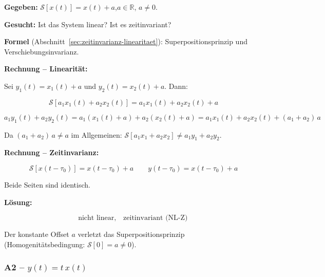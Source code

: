 \begin{beispiel}[Linearität und Zeitinvarianz: $y(t) = x(t) + a$]

\textbf{Gegeben:} $\mathcal{S}[x(t)] = x(t) + a$,\quad $a \in \mathbb{R}$, $a \neq 0$.

\textbf{Gesucht:} Ist das System linear? Ist es zeitinvariant?

\textbf{Formel} (Abschnitt~\ref{sec:zeitinvarianz-linearitaet}): Superpositionsprinzip
und Verschiebungsinvarianz.

\textbf{Rechnung – Linearität:}

Sei $y_1(t) = x_1(t) + a$ und $y_2(t) = x_2(t) + a$. Dann:

$$
\mathcal{S}[a_1 x_1(t) + a_2 x_2(t)]
= a_1 x_1(t) + a_2 x_2(t) + a
$$

$$
a_1 y_1(t) + a_2 y_2(t)
= a_1(x_1(t)+a) + a_2(x_2(t)+a)
= a_1 x_1(t) + a_2 x_2(t) + (a_1+a_2)\,a
$$

Da $(a_1+a_2)\,a \neq a$ im Allgemeinen: $\mathcal{S}[a_1 x_1 + a_2 x_2] \neq a_1 y_1 + a_2 y_2$.

\textbf{Rechnung – Zeitinvarianz:}

$$
\mathcal{S}[x(t-\tau_0)] = x(t-\tau_0) + a
\qquad
y(t-\tau_0) = x(t-\tau_0) + a
$$

Beide Seiten sind identisch.

\textbf{Lösung:}

$$
\boxed{\text{nicht linear},\quad \text{zeitinvariant (NL-Z)}}
$$

Der konstante Offset $a$ verletzt das Superpositionsprinzip (Homogenitätsbedingung: $\mathcal{S}[0] = a \neq 0$).

\end{beispiel}

\subsubsection*{A2 – $y(t) = t\,x(t)$}

